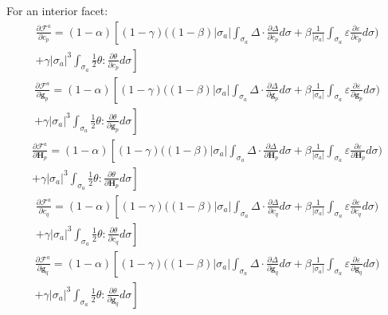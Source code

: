 \documentclass[11pt]{article} %
\begin{document}
For an interior facet:
\begin{eqnarray}
	\frac{\partial \mathcal{F}^a}{\partial c_p} = (1-\alpha) \left[ (1-\gamma) \bigg( (1-\beta) | \sigma_a | \int_{\sigma_a} \Delta \cdot \frac{\partial \Delta}{\partial c_p} d \sigma + \beta \frac{1}{| \sigma_a |} \int_{\sigma_a} \varepsilon \frac{\partial \varepsilon}{\partial c_p} d \sigma \bigg) \right. \nonumber \\ \left. + \gamma | \sigma_a |^3 \int_{\sigma_a} \frac{1}{2} \theta \colon \frac{\partial \theta}{\partial c_p} d \sigma \right]
\end{eqnarray}
\begin{eqnarray}
	\frac{\partial \mathcal{F}^a}{\partial \mathbf{g}_p} = (1-\alpha) \left[ (1-\gamma) \bigg( (1-\beta) | \sigma_a | \int_{\sigma_a} \Delta \cdot \frac{\partial \Delta}{\partial \mathbf{g}_p} d \sigma + \beta \frac{1}{| \sigma_a |} \int_{\sigma_a} \varepsilon \frac{\partial \varepsilon}{\partial \mathbf{g}_p} d \sigma \bigg) \right. \nonumber \\ \left. + \gamma | \sigma_a |^3 \int_{\sigma_a} \frac{1}{2} \theta \colon \frac{\partial \theta}{\partial \mathbf{g}_p} d \sigma \right]
\end{eqnarray}
\begin{eqnarray}
	\frac{\partial \mathcal{F}^a}{\partial \mathbf{H}_p} = (1-\alpha) \left[ (1-\gamma) \bigg( (1-\beta) | \sigma_a | \int_{\sigma_a} \Delta \cdot \frac{\partial \Delta}{\partial \mathbf{H}_p} d \sigma + \beta \frac{1}{| \sigma_a |} \int_{\sigma_a} \varepsilon \frac{\partial \varepsilon}{\partial \mathbf{H}_p} d \sigma \bigg) \right. \nonumber \\ \left. + \gamma | \sigma_a |^3 \int_{\sigma_a} \frac{1}{2} \theta \colon \frac{\partial \theta}{\partial \mathbf{H}_p} d \sigma \right]
\end{eqnarray}
\begin{eqnarray}
	\frac{\partial \mathcal{F}^a}{\partial c_q} = (1-\alpha) \left[ (1-\gamma) \bigg( (1-\beta) | \sigma_a | \int_{\sigma_a} \Delta \cdot \frac{\partial \Delta}{\partial c_q} d \sigma + \beta \frac{1}{| \sigma_a |} \int_{\sigma_a} \varepsilon \frac{\partial \varepsilon}{\partial c_q} d \sigma \bigg) \right. \nonumber \\ \left. + \gamma | \sigma_a |^3 \int_{\sigma_a} \frac{1}{2} \theta \colon \frac{\partial \theta}{\partial c_q} d \sigma \right]
\end{eqnarray}
\begin{eqnarray}
	\frac{\partial \mathcal{F}^a}{\partial \mathbf{g}_q} = (1-\alpha) \left[ (1-\gamma) \bigg( (1-\beta) | \sigma_a | \int_{\sigma_a} \Delta \cdot \frac{\partial \Delta}{\partial \mathbf{g}_q} d \sigma + \beta \frac{1}{| \sigma_a |} \int_{\sigma_a} \varepsilon \frac{\partial \varepsilon}{\partial \mathbf{g}_q} d \sigma \bigg) \right. \nonumber \\ \left. + \gamma | \sigma_a |^3 \int_{\sigma_a} \frac{1}{2} \theta \colon \frac{\partial \theta}{\partial \mathbf{g}_q} d \sigma \right]
\end{eqnarray}
\end{document}
